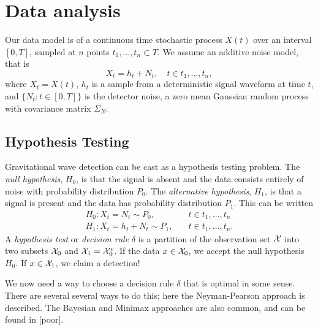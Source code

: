 %
%

\chapter{Data analysis}           
Our data model is of a continuous time stochastic process $X(t)$ over an interval $[0,T]$, sampled at $n$ points ${t_1, \ldots, t_n} \subset T$. We assume an additive noise model, that is 
\begin{equation}
X_t=h_t+N_t, \hspace{12pt} t\in {t_1, \ldots, t_n}  ,
\end{equation}
where $X_t=X(t)$, $h_t$ is a sample from a deterministic signal waveform at time $t$, and $\{N_t: t \in [0,T]\}$ is the detector noise, a zero mean Gaussian random process with covariance matrix $\Sigma_N$. 


\section{Hypothesis Testing}
Gravitational wave detection can be cast as a hypothesis testing problem. The \textit{null hypothesis}, $H_0$, is that the signal is absent and the data consists entirely of noise with probability distribution $P_0$. The \textit{alternative hypothesis}, $H_1$, is that a signal is present and the data has probability distribution $P_1$. This can be written
\begin{equation}
\label{eq:hyppair}
\begin{array}{ll}
H_0: X_t = N_t \sim P_0, &\hspace{12pt} t\in {t_1, \ldots, t_n} \\
H_1: X_t = h_t + N_t \sim P_1, &\hspace{12pt} t\in {t_1, \ldots, t_n}. 
\end{array}
\end{equation}
A \textit{hypothesis test} or \textit{decision rule} $\delta$ is a partition of the observation set $\mathcal{X}$ into two subsets $\mathcal{X}_0$ and $\mathcal{X}_1=\mathcal{X}_0^c$. If the data  $x \in \mathcal{X}_0$, we accept the null hypothesis $H_0$. If $x \in \mathcal{X}_1$, we claim a detection!

We now need a way to choose a decision rule $\delta$ that is optimal in some sense. There are several several ways to do this; here the Neyman-Pearson approach is described. The Bayesian and Minimax approaches are also common, and can be found in [poor].

